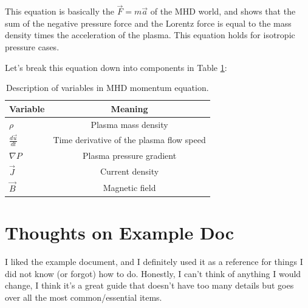 \documentclass[12pt, letterpaper]{article}
\begin{document}
This equation is basically the $\vec{F}=m\vec{a}$ of the MHD world, and shows that the sum of the negative pressure force and the Lorentz force is equal to the mass density times the acceleration of the plasma. This equation holds for isotropic pressure cases.

Let's break this equation down into components in Table \ref{tab:1}:

\begin{table}[ht!]
  \centering
  \begin{tabular}{|l|c|}
    \hline
    Variable & Meaning\\
    \hline
    $\rho$ & Plasma mass density\\ 
    $\frac{d \vec{u}}{dt}$ & Time derivative of the plasma flow speed\\
    $\nabla P$ & Plasma pressure gradient\\
    $\vec{J}$ & Current density\\
    $\vec{B}$ & Magnetic field\\
    \hline
  \end{tabular}
  \caption{Description of variables in MHD momentum equation.}
  \label{tab:1}
\end{table}

\section{Thoughts on Example Doc}


I liked the example document, and I definitely used it as a reference for things I did not know (or forgot) how to do. Honestly, I can't think of anything I would change, I think it's a great guide that doesn't have too many details but goes over all the most common/essential items.
\end{document}
